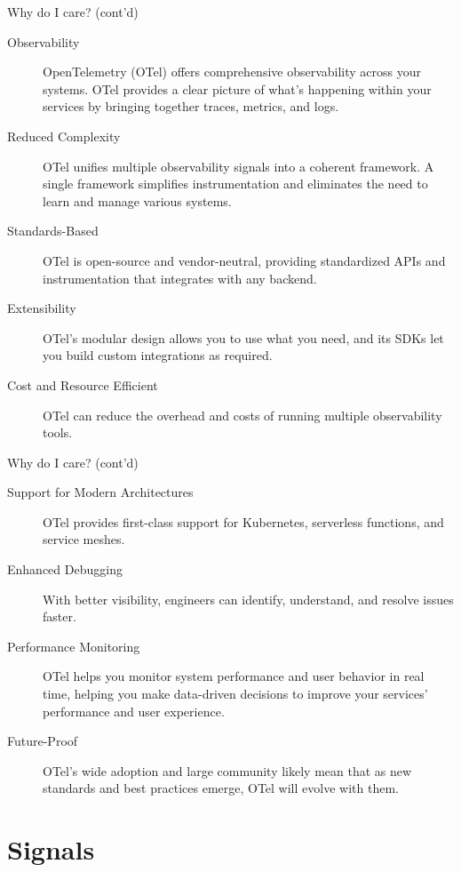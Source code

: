 \documentclass[aspectratio=169]{beamer}
\begin{document}
\begin{frame}{Why do I care? (cont'd)}
  \begin{description}
    \item[Observability] OpenTelemetry (OTel) offers comprehensive observability
      across your systems. OTel provides a clear picture of what's happening
      within your services by bringing together traces, metrics, and logs.
    \item[Reduced Complexity] OTel unifies multiple observability signals into a
      coherent framework. A single framework simplifies instrumentation and
      eliminates the need to learn and manage various systems.
    \item[Standards-Based] OTel is open-source and vendor-neutral, providing
      standardized APIs and instrumentation that integrates with any backend.
    \item[Extensibility] OTel's modular design allows you to use what you need,
      and its SDKs let you build custom integrations as required.
    \item[Cost and Resource Efficient] OTel can reduce the overhead and costs of
      running multiple observability tools.
  \end{description}
\end{frame}

\begin{frame}{Why do I care? (cont'd)}
  \begin{description}
    \item[Support for Modern Architectures] OTel provides first-class support
      for Kubernetes, serverless functions, and service meshes.
    \item[Enhanced Debugging] With better visibility, engineers can identify,
      understand, and resolve issues faster.
    \item[Performance Monitoring] OTel helps you monitor system performance and
      user behavior in real time, helping you make data-driven decisions to
      improve your services' performance and user experience.
    \item[Future-Proof] OTel's wide adoption and large community likely mean
      that as new standards and best practices emerge, OTel will evolve with them.
  \end{description}
\end{frame}

\section{Signals}
\end{document}
